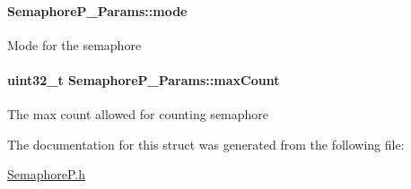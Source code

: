 \paragraph[{mode}]{ Semaphore\+P\+\_\+\+Params\+::mode}\label{struct_semaphore_p___params_a4d12bb8c19485dd4d4fe2616a41a9948}
Mode for the semaphore 
\paragraph[{max\+Count}]{\setlength{\rightskip}{0pt plus 5cm}uint32\+\_\+t Semaphore\+P\+\_\+\+Params\+::max\+Count}\label{struct_semaphore_p___params_a4fdddd248bfd43a54ed6958a47838f88}
The max count allowed for counting semaphore 

The documentation for this struct was generated from the following file\+:\begin{DoxyCompactItemize}
\item 
\hyperlink{_semaphore_p_8h}{Semaphore\+P.\+h}\end{DoxyCompactItemize}
